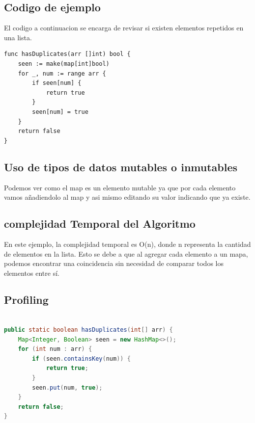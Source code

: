 \documentclass{article}
\begin{document}
\subsection{Codigo de ejemplo}

El codigo a continuacion se encarga de revisar si existen elementos repetidos en una lista.

\begin{lstlisting}[language=Golang, caption=Ejemplo de código en Golang]
func hasDuplicates(arr []int) bool {
    seen := make(map[int]bool)
    for _, num := range arr {
        if seen[num] {
            return true
        }
        seen[num] = true
    }
    return false
}

\end{lstlisting}
\subsection{Uso de tipos de datos mutables o inmutables}
Podemos ver como el map es un elemento mutable ya que por cada elemento vamos añadiendolo al map y asi mismo editando su valor indicando que ya existe.


\subsection{complejidad Temporal del Algoritmo}
En este ejemplo, la complejidad temporal es O(n), donde n representa la cantidad de elementos en la lista. Esto se debe a que al agregar cada elemento a un mapa, podemos encontrar una coincidencia sin necesidad de comparar todos los elementos entre sí.

\subsection{Profiling}

\begin{lstlisting}[language=Java, caption=Ejemplo de código en Java]

public static boolean hasDuplicates(int[] arr) {
    Map<Integer, Boolean> seen = new HashMap<>();
    for (int num : arr) {
        if (seen.containsKey(num)) {
            return true;
        }
        seen.put(num, true);
    }
    return false;
}
\end{lstlisting}
\end{document}
